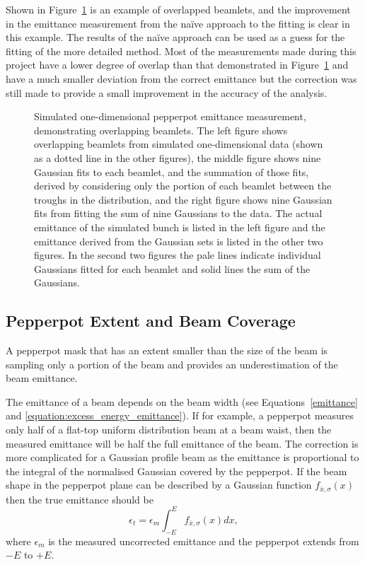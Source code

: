 Shown in Figure~\ref{figure:overlap_example} is an example of overlapped beamlets, and the improvement in the emittance measurement from the na\"ive approach to the fitting is clear in this example.
The results of the na\"ive approach can be used as a guess for the fitting of the more detailed method.
Most of the measurements made during this project have a lower degree of overlap than that demonstrated in Figure~\ref{figure:overlap_example} and have a much smaller deviation from the correct emittance but the correction was still made to provide a small improvement in the accuracy of the analysis.

\begin{figure}
    \center
    
    \caption[An example of overlapping beamlets.]{Simulated one-dimensional pepperpot emittance measurement, demonstrating overlapping beamlets.
    The left figure shows overlapping beamlets from simulated one-dimensional data (shown as a dotted line in the other figures), the middle figure shows nine Gaussian fits to each beamlet, and the summation of those fits, derived by considering only the portion of each beamlet between the troughs in the distribution, and the right figure shows nine Gaussian fits from fitting the sum of nine Gaussians to the data.
    The actual emittance of the simulated bunch is listed in the left figure and the emittance derived from the Gaussian sets is listed in the other two figures.
    In the second two figures the pale lines indicate individual Gaussians fitted for each beamlet and solid lines the sum of the Gaussians.}
    \label{figure:overlap_example}
\end{figure}


\subsection{Pepperpot Extent and Beam Coverage}
A pepperpot mask that has an extent smaller than the size of the beam is sampling only a portion of the beam and provides an underestimation of the beam emittance.

The emittance of a beam depends on the beam width (see Equations~\ref{emittance} and \ref{equation:excess_energy_emittance}).
If for example, a pepperpot measures only half of a flat-top uniform distribution beam at a beam waist, then the measured emittance will be half the full emittance of the beam.
The correction is more complicated for a Gaussian profile beam as the emittance is proportional to the integral of the normalised Gaussian covered by the pepperpot.
If the beam shape in the pepperpot plane can be described by a Gaussian function $f_{\bar{x},\sigma}(x)$ then the true emittance should be
\begin{equation}\label{equations:emittance_correction_simple}
\epsilon_t = \epsilon_m \int_{-E}^{E} f_{\bar{x}, \sigma}(x) dx,
\end{equation}
where $\epsilon_m$ is the measured uncorrected emittance and the pepperpot extends from $-E$ to $+E$.

